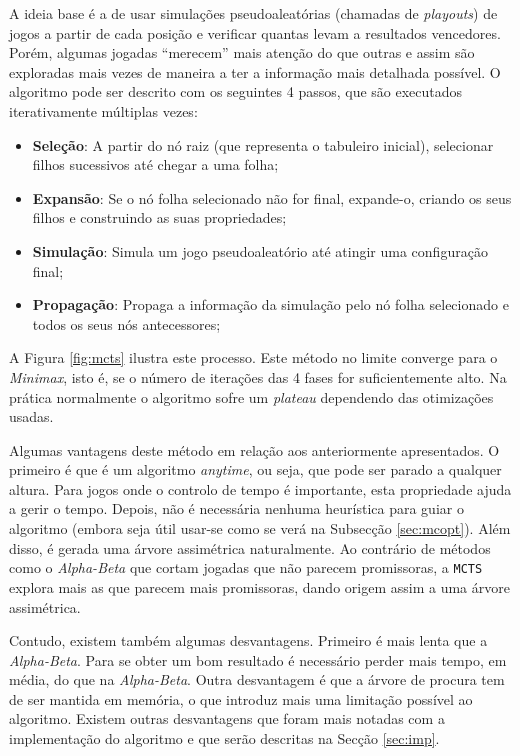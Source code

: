 \documentclass[12pt,a4paper,oneside]{article}
\begin{document}
A ideia base é a de usar simulações pseudoaleatórias (chamadas de
\textit{playouts}) de jogos a partir de cada posição e verificar
quantas levam a resultados vencedores. Porém, algumas jogadas
``merecem'' mais atenção do que outras e assim são exploradas mais
vezes de maneira a ter a informação mais detalhada possível. O
algoritmo pode ser descrito com os seguintes 4 passos, que são
executados iterativamente múltiplas vezes:

\begin{itemize}
  \item \textbf{Seleção}: A partir do nó raiz (que representa o
    tabuleiro inicial), selecionar filhos sucessivos até chegar a uma
    folha;
  \item \textbf{Expansão}: Se o nó folha selecionado não for final,
    expande-o, criando os seus filhos e construindo as suas
    propriedades;
  \item \textbf{Simulação}: Simula um jogo pseudoaleatório até atingir
    uma configuração final;
  \item \textbf{Propagação}: Propaga a informação da simulação pelo nó
    folha selecionado e todos os seus nós antecessores;
\end{itemize}

A Figura \ref{fig:mcts} ilustra este processo. Este método no limite
converge para o \textit{Minimax}, isto é, se o número de iterações das
4 fases for suficientemente alto. Na prática normalmente o algoritmo
sofre um \textit{plateau} dependendo das otimizações usadas.

Algumas vantagens deste método em relação aos anteriormente
apresentados. O primeiro é que é um algoritmo \textit{anytime}, ou
seja, que pode ser parado a qualquer altura. Para jogos onde o
controlo de tempo é importante, esta propriedade ajuda a gerir o
tempo. Depois, não é necessária nenhuma heurística para guiar o
algoritmo (embora seja útil usar-se como se verá na Subsecção
\ref{sec:mcopt}). Além disso, é gerada uma árvore assimétrica
naturalmente. Ao contrário de métodos como o \textit{Alpha-Beta} que
cortam jogadas que não parecem promissoras, a \texttt{MCTS} explora
mais as que parecem mais promissoras, dando origem assim a uma árvore
assimétrica.

Contudo, existem também algumas desvantagens. Primeiro é mais lenta
que a \textit{Alpha-Beta}. Para se obter um bom resultado é necessário
perder mais tempo, em média, do que na \textit{Alpha-Beta}. Outra
desvantagem é que a árvore de procura tem de ser mantida em memória, o
que introduz mais uma limitação possível ao algoritmo. Existem outras
desvantagens que foram mais notadas com a implementação do algoritmo e
que serão descritas na Secção \ref{sec:imp}.
\end{document}
